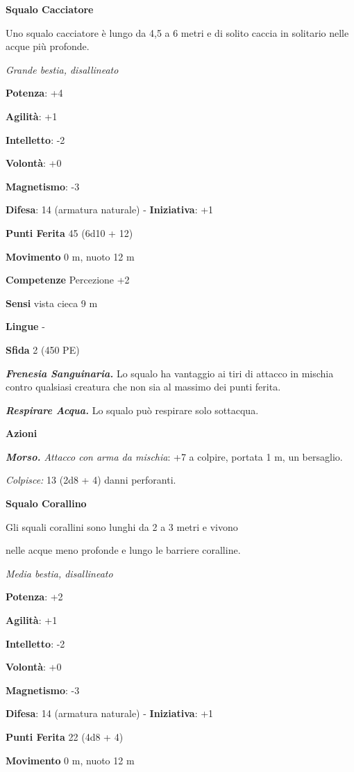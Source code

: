 \begin{multicols}{2}
\textbf{Squalo Cacciatore}

Uno squalo cacciatore è lungo da 4,5 a 6 metri e di solito caccia in
solitario nelle acque più profonde.

\emph{Grande bestia, disallineato}

\textbf{Potenza}: +4

\textbf{Agilità}: +1

\textbf{Intelletto}: -2

\textbf{Volontà}: +0

\textbf{Magnetismo}: -3

\textbf{Difesa}: 14 (armatura naturale) - \textbf{Iniziativa}: +1

\textbf{Punti Ferita} 45 (6d10 + 12)

\textbf{Movimento} 0 m, nuoto 12 m

\textbf{Competenze} Percezione +2

\textbf{Sensi} vista cieca 9 m

\textbf{Lingue} -

\textbf{Sfida} 2 (450 PE)\smallskip

\emph{\textbf{Frenesia Sanguinaria.}} Lo squalo ha vantaggio ai tiri di
attacco in mischia contro qualsiasi creatura che non sia al massimo dei
punti ferita.

\emph{\textbf{Respirare Acqua.}} Lo squalo può respirare solo sottacqua.

\smallskip\textbf{Azioni}

\emph{\textbf{Morso.} Attacco con arma da mischia}: +7 a colpire,
portata 1 m, un bersaglio.

\emph{Colpisce:} 13 (2d8 + 4) danni perforanti.

\textbf{Squalo Corallino}

Gli squali corallini sono lunghi da 2 a 3 metri e vivono

nelle acque meno profonde e lungo le barriere coralline.

\emph{Media bestia, disallineato}

\textbf{Potenza}: +2

\textbf{Agilità}: +1

\textbf{Intelletto}: -2

\textbf{Volontà}: +0

\textbf{Magnetismo}: -3

\textbf{Difesa}: 14 (armatura naturale) - \textbf{Iniziativa}: +1

\textbf{Punti Ferita} 22 (4d8 + 4)

\textbf{Movimento} 0 m, nuoto 12 m


\end{multicols}
